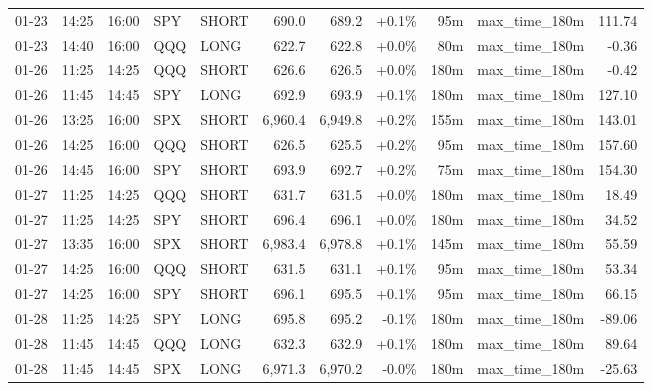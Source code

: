 \documentclass[11pt,a4paper,twoside]{article}
\begin{document}
\begin{center}
\begin{longtable}{>{\color{txtmain}}l l l l l r r r r >{\color{txtmain}}l r}
01-23 & 14:25 & 16:00 & SPY & SHORT & 690.0 & 689.2 & \textcolor{wingreen}{+0.1\%} & 95m & max\_time\_180m & \textcolor{wingreen}{111.74} \\
01-23 & 14:40 & 16:00 & QQQ & LONG & 622.7 & 622.8 & \textcolor{wingreen}{+0.0\%} & 80m & max\_time\_180m & \textcolor{lossred}{-0.36} \\
01-26 & 11:25 & 14:25 & QQQ & SHORT & 626.6 & 626.5 & \textcolor{wingreen}{+0.0\%} & 180m & max\_time\_180m & \textcolor{lossred}{-0.42} \\
01-26 & 11:45 & 14:45 & SPY & LONG & 692.9 & 693.9 & \textcolor{wingreen}{+0.1\%} & 180m & max\_time\_180m & \textcolor{wingreen}{127.10} \\
01-26 & 13:25 & 16:00 & SPX & SHORT & 6,960.4 & 6,949.8 & \textcolor{wingreen}{+0.2\%} & 155m & max\_time\_180m & \textcolor{wingreen}{143.01} \\
01-26 & 14:25 & 16:00 & QQQ & SHORT & 626.5 & 625.5 & \textcolor{wingreen}{+0.2\%} & 95m & max\_time\_180m & \textcolor{wingreen}{157.60} \\
01-26 & 14:45 & 16:00 & SPY & SHORT & 693.9 & 692.7 & \textcolor{wingreen}{+0.2\%} & 75m & max\_time\_180m & \textcolor{wingreen}{154.30} \\
01-27 & 11:25 & 14:25 & QQQ & SHORT & 631.7 & 631.5 & \textcolor{wingreen}{+0.0\%} & 180m & max\_time\_180m & \textcolor{wingreen}{18.49} \\
01-27 & 11:25 & 14:25 & SPY & SHORT & 696.4 & 696.1 & \textcolor{wingreen}{+0.0\%} & 180m & max\_time\_180m & \textcolor{wingreen}{34.52} \\
01-27 & 13:35 & 16:00 & SPX & SHORT & 6,983.4 & 6,978.8 & \textcolor{wingreen}{+0.1\%} & 145m & max\_time\_180m & \textcolor{wingreen}{55.59} \\
01-27 & 14:25 & 16:00 & QQQ & SHORT & 631.5 & 631.1 & \textcolor{wingreen}{+0.1\%} & 95m & max\_time\_180m & \textcolor{wingreen}{53.34} \\
01-27 & 14:25 & 16:00 & SPY & SHORT & 696.1 & 695.5 & \textcolor{wingreen}{+0.1\%} & 95m & max\_time\_180m & \textcolor{wingreen}{66.15} \\
01-28 & 11:25 & 14:25 & SPY & LONG & 695.8 & 695.2 & \textcolor{lossred}{-0.1\%} & 180m & max\_time\_180m & \textcolor{lossred}{-89.06} \\
01-28 & 11:45 & 14:45 & QQQ & LONG & 632.3 & 632.9 & \textcolor{wingreen}{+0.1\%} & 180m & max\_time\_180m & \textcolor{wingreen}{89.64} \\
01-28 & 11:45 & 14:45 & SPX & LONG & 6,971.3 & 6,970.2 & \textcolor{lossred}{-0.0\%} & 180m & max\_time\_180m & \textcolor{lossred}{-25.63} \\

\end{longtable}
\end{center}
\end{document}
